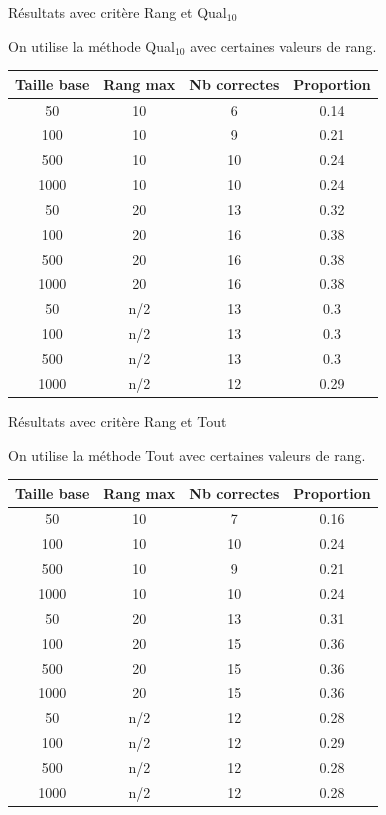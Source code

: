 \documentclass{beamer}
\begin{document}
\begin{frame}{Résultats avec critère Rang et Qual$_{10}$}

On utilise la méthode Qual$_{10}$ avec certaines valeurs de rang.
\begin{tabular}{|c|c|c|c|}
   \hline
   Taille base & Rang max & Nb correctes & Proportion\\
   \hline
   50 & 10  & 6 & 0.14  \\
   \hline
   100 & 10  & 9 & 0.21  \\
   \hline
   500 & 10  & 10 & 0.24  \\
   \hline
   1000 & 10 & 10 & 0.24  \\
   \hline
   \hline
   50 & 20  & 13 & 0.32  \\
   \hline
   100 & 20 & 16 & 0.38  \\
   \hline
   500 & 20 & 16 & 0.38  \\
   \hline
   1000 & 20 & 16 & 0.38  \\
   \hline
   50 & n/2 & 13 & 0.3  \\
   \hline
   100 & n/2 & 13 & 0.3  \\
   \hline
   500 & n/2 & 13 & 0.3  \\
   \hline
   1000 & n/2 & 12 & 0.29  \\
   \hline
\end{tabular}
\end{frame}

\begin{frame}{Résultats avec critère Rang et Tout}

On utilise la méthode Tout avec certaines valeurs de rang.
\begin{tabular}{|c|c|c|c|}
   \hline
   Taille base & Rang max & Nb correctes & Proportion\\
   \hline
   50 & 10  & 7 & 0.16  \\
   \hline
   100 & 10  & 10 & 0.24  \\
   \hline
   500 & 10  & 9 & 0.21  \\
   \hline
   1000 & 10 & 10 & 0.24  \\
   \hline
   \hline
   50 & 20  & 13 & 0.31  \\
   \hline
   100 & 20 & 15 & 0.36  \\
   \hline
   500 & 20 & 15 & 0.36  \\
   \hline
   1000 & 20 & 15 & 0.36  \\
   \hline
   50 & n/2 & 12 & 0.28  \\
   \hline
   100 & n/2 & 12 & 0.29  \\
   \hline
   500 & n/2 & 12 & 0.28  \\
   \hline
   1000 & n/2 & 12 & 0.28  \\
   \hline
\end{tabular}
\end{frame}
\end{document}
